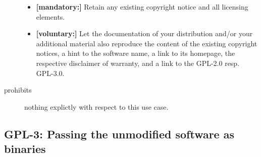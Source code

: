 \begin{description}
\begin{itemize}
  \item \textbf{[mandatory:]} Retain any existing copyright notice and all
  licensing elements.
    
  \item \textbf{[voluntary:]} Let the documentation of your distribution and/or
  your additional material also reproduce the content of the existing
  copyright notices, a hint to the software name, a link to its homepage,
  the respective disclaimer of warranty, and a link to the GPL-2.0 resp.
  GPL-3.0.
  

  
\end{itemize}

\item[prohibits] nothing explictly with respect to this use case.

\end{description}


\subsection{GPL-3: Passing the unmodified software as binaries} 

